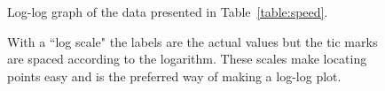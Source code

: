 \begin{figure}[!hbt]   %
\begin{center}
{}
\end{center}
\caption{Log-log graph of the data presented in Table~\protect\ref{table:speed}.
          \label{fig:speed_log}}
\end{figure}

\begin{figure}[!hbt]   %
\begin{center}
{}
\end{center}
\caption{With a ``log  scale" the labels are the actual values
but the tic marks are spaced according to the logarithm. 
These scales make locating points easy and is the preferred
way of making a log-log plot.
          \label{fig:speed_true_log}}
\end{figure}







